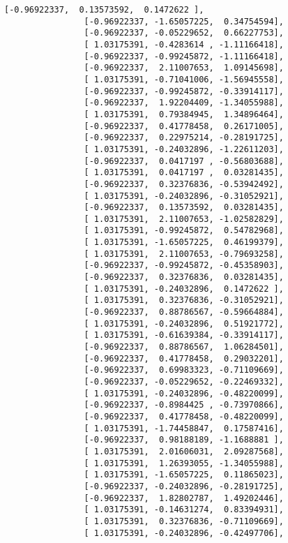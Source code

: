 \documentclass[11pt]{article}
\begin{document}
\begin{Verbatim}[commandchars=\\\{\}]
                [-0.96922337,  0.13573592,  0.1472622 ],
                [-0.96922337, -1.65057225,  0.34754594],
                [-0.96922337, -0.05229652,  0.66227753],
                [ 1.03175391, -0.4283614 , -1.11166418],
                [-0.96922337, -0.99245872, -1.11166418],
                [-0.96922337,  2.11007653,  1.09145698],
                [ 1.03175391, -0.71041006, -1.56945558],
                [-0.96922337, -0.99245872, -0.33914117],
                [-0.96922337,  1.92204409, -1.34055988],
                [ 1.03175391,  0.79384945,  1.34896464],
                [-0.96922337,  0.41778458,  0.26171005],
                [-0.96922337,  0.22975214, -0.28191725],
                [ 1.03175391, -0.24032896, -1.22611203],
                [-0.96922337,  0.0417197 , -0.56803688],
                [ 1.03175391,  0.0417197 ,  0.03281435],
                [-0.96922337,  0.32376836, -0.53942492],
                [ 1.03175391, -0.24032896, -0.31052921],
                [-0.96922337,  0.13573592,  0.03281435],
                [ 1.03175391,  2.11007653, -1.02582829],
                [ 1.03175391, -0.99245872,  0.54782968],
                [ 1.03175391, -1.65057225,  0.46199379],
                [ 1.03175391,  2.11007653, -0.79693258],
                [-0.96922337, -0.99245872, -0.45358903],
                [-0.96922337,  0.32376836,  0.03281435],
                [ 1.03175391, -0.24032896,  0.1472622 ],
                [ 1.03175391,  0.32376836, -0.31052921],
                [-0.96922337,  0.88786567, -0.59664884],
                [ 1.03175391, -0.24032896,  0.51921772],
                [ 1.03175391, -0.61639384, -0.33914117],
                [-0.96922337,  0.88786567,  1.06284501],
                [-0.96922337,  0.41778458,  0.29032201],
                [-0.96922337,  0.69983323, -0.71109669],
                [-0.96922337, -0.05229652, -0.22469332],
                [ 1.03175391, -0.24032896, -0.48220099],
                [-0.96922337, -0.8984425 , -0.73970866],
                [-0.96922337,  0.41778458, -0.48220099],
                [ 1.03175391, -1.74458847,  0.17587416],
                [-0.96922337,  0.98188189, -1.1688881 ],
                [ 1.03175391,  2.01606031,  2.09287568],
                [ 1.03175391,  1.26393055, -1.34055988],
                [ 1.03175391, -1.65057225,  0.11865023],
                [-0.96922337, -0.24032896, -0.28191725],
                [-0.96922337,  1.82802787,  1.49202446],
                [ 1.03175391, -0.14631274,  0.83394931],
                [ 1.03175391,  0.32376836, -0.71109669],
                [ 1.03175391, -0.24032896, -0.42497706],

\end{Verbatim}
\end{document}
